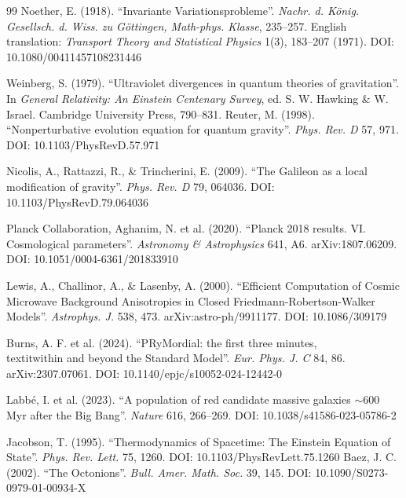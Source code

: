 \documentclass[a4paper,12pt]{article}
\begin{document}
\begin{thebibliography}{99}
 Noether, E. (1918). ``Invariante Variationsprobleme''. \textit{Nachr. d. König. Gesellsch. d. Wiss. zu Göttingen, Math-phys. Klasse}, 235--257. English translation: \textit{Transport Theory and Statistical Physics} 1(3), 183--207 (1971). DOI: 10.1080/00411457108231446


 Weinberg, S. (1979). ``Ultraviolet divergences in quantum theories of gravitation''. In \textit{General Relativity: An Einstein Centenary Survey}, ed. S. W. Hawking \& W. Israel. Cambridge University Press, 790--831.
 Reuter, M. (1998). ``Nonperturbative evolution equation for quantum gravity''. \textit{Phys. Rev. D} 57, 971. DOI: 10.1103/PhysRevD.57.971

 Nicolis, A., Rattazzi, R., \& Trincherini, E. (2009). ``The Galileon as a local modification of gravity''. \textit{Phys. Rev. D} 79, 064036. DOI: 10.1103/PhysRevD.79.064036


 Planck Collaboration, Aghanim, N. et al. (2020). ``Planck 2018 results. VI. Cosmological parameters''. \textit{Astronomy \& Astrophysics} 641, A6. arXiv:1807.06209. DOI: 10.1051/0004-6361/201833910

 Lewis, A., Challinor, A., \& Lasenby, A. (2000). ``Efficient Computation of Cosmic Microwave Background Anisotropies in Closed Friedmann-Robertson-Walker Models''. \textit{Astrophys. J.} 538, 473. arXiv:astro-ph/9911177. DOI: 10.1086/309179

 Burns, A. F. et al. (2024). ``PRyMordial: the first three minutes, \\textit{within} and beyond the Standard Model''. \textit{Eur. Phys. J. C} 84, 86. arXiv:2307.07061. DOI: 10.1140/epjc/s10052-024-12442-0

 Labb\'{e}, I. et al. (2023). ``A population of red candidate massive galaxies $\sim$600 Myr after the Big Bang''. \textit{Nature} 616, 266--269. DOI: 10.1038/s41586-023-05786-2

 Jacobson, T. (1995). ``Thermodynamics of Spacetime: The Einstein Equation of State''. \textit{Phys. Rev. Lett.} 75, 1260. DOI: 10.1103/PhysRevLett.75.1260
 Baez, J. C. (2002). ``The Octonions''. \textit{Bull. Amer. Math. Soc.} 39, 145. DOI: 10.1090/S0273-0979-01-00934-X

\end{thebibliography}




\end{document}
